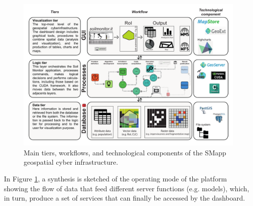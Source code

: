 \documentclass[APA,LATO1COL,doublespace]{WileyNJD-v2}
\begin{document}
\begin{figure}[t]
    \centerline{\includegraphics[width=500pt]{Figure02.pdf}}
    \caption{Main tiers, workflows, and technological components of the SMapp geospatial cyber infrastructure.} \label{fig:GCI}
\end{figure}

In Figure \ref{fig:GCI}, a synthesis is sketched of the operating mode of the platform showing the flow of data that feed different server functions (e.g. models), which, in turn, produce a set of services that can finally be accessed by the dashboard.
\end{document}

